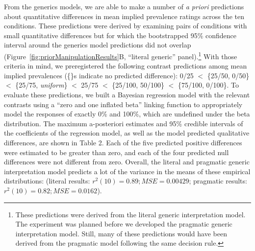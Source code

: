 \documentclass[floatsintext,doc]{apa6}
\let\rmarkdownfootnote\footnote%
\def\footnote{\protect\rmarkdownfootnote}
\begin{document}
From the generics models, we are able to make a number of \emph{a priori} predictions about quantitative differences in mean implied prevalence ratings across the ten conditions.
These predictions were derived by examining pairs of conditions with small quantitative differences but for which the bootstrapped 95\% confidence interval around the generics model predictions did not overlap (Figure~\ref{fig:priorManipulationResults}B, \enquote{literal generic} panel).\footnote{These predictions were derived from the literal generic interpretation model. The experiment was planned before we developed the pragmatic generic interpretation model. Still, many of these predictions would have been derived from the pragmatic model following the same decision rule.}
With those criteria in mind, we preregistered the following contrast predictions among mean implied prevalences (\{\}s indicate no predicted difference): 0/25 \(<\) \{25/50, 0/50\} \(<\) \{25/75, \emph{uniform}\} \(<\) 25/75 \(<\) \{25/100, 50/100\} \(<\) \{75/100, 0/100\}.
To evaluate these predictions, we built a Bayesian regression model with the relevant contrasts using a \enquote{zero and one inflated beta} linking function to appropriately model the responses of exactly 0\% and 100\%, which are undefined under the beta distribution.
The maximum a-posteriori estimates and 95\% credible intervals of the coefficients of the regression model, as well as the model predicted qualitative differences, are shown in Table 2.
Each of the five predicted positive differences were estimated to be greater than zero, and each of the four predicted null differences were not different from zero.
Overall, the literal and pragmatic generic interpretation model predicts a lot of the variance in the means of these empirical distributions: (literal results: \(r^2(10) = 0.89; MSE = 0.00429\); pragmatic results: \(r^2(10) = 0.82; MSE = 0.0162\)).
\end{document}
